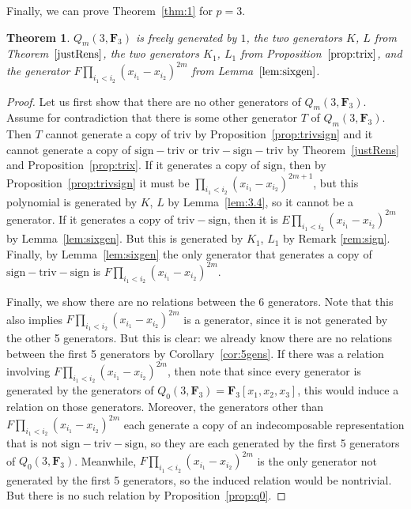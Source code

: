 \documentclass[11pt]{article}
\numberwithin{equation}{section}
\newtheorem{Theorem}{Theorem}[section]
\theoremstyle{definition}
\numberwithin{equation}{section}
\newcommand{\triv}{\mathrm{triv}}
\newcommand{\sign}{\mathrm{sign}}
\newcommand{\trix}{\mathrm{triv-sign-triv}}
\newcommand{\six}{\mathrm{sign-triv-sign}}
\newcommand{\siv}{\mathrm{sign-triv}}
\newcommand{\tign}{\mathrm{triv-sign}}
\begin{document}
 Finally, we can prove Theorem~\ref{thm:1} for $p=3$.

 \begin{Theorem}
 $Q_m(3,\mathbf{F}_3)$ is freely generated by $1$, the two generators $K$, $L$ from Theorem~$\ref{justRens}$, the two generators $K_1$, $L_1$ from Proposition~$\ref{prop:trix}$, and the generator $F\prod_{i_1<i_2}(x_{i_1}-x_{i_2})^{2m}$ from Lemma~$\ref{lem:sixgen}$.
 \end{Theorem}

 \begin{proof}
 Let us first show that there are no other generators of $Q_m(3,\mathbf{F}_3)$. Assume for contradiction that there is some other generator $T$ of $Q_m(3,\mathbf{F}_3)$. Then $T$ cannot generate a copy of $\triv$ by Proposition~\ref{prop:trivsign} and it cannot generate a copy of $\siv$ or $\trix$ by Theorem~\ref{justRens} and Proposition~\ref{prop:trix}. If it generates a copy of $\sign$, then by Proposition~\ref{prop:trivsign} it must be $\prod_{i_1<i_2}(x_{i_1}-x_{i_2})^{2m+1}$, but this polynomial is generated by $K$, $L$ by Lemma~\ref{lem:3.4}, so it cannot be a generator. If it generates a copy of $\tign$, then it is $E\prod_{i_1<i_2}(x_{i_1}-x_{i_2})^{2m}$ by Lemma~\ref{lem:sixgen}. But this is generated by $K_1$, $L_1$ by Remark \ref{rem:sign}. Finally, by Lemma~\ref{lem:sixgen} the only generator that generates a copy of $\six$ is $F\prod_{i_1<i_2}(x_{i_1}-x_{i_2})^{2m}$.

 Finally, we show there are no relations between the 6 generators. Note that this also implies $F\prod_{i_1<i_2}(x_{i_1}-x_{i_2})^{2m}$ is a generator, since it is not generated by the other 5 generators. But this is clear: we already know there are no relations between the first 5 generators by Corollary~\ref{cor:5gens}. If there was a relation involving $F\prod_{i_1<i_2}(x_{i_1}-x_{i_2})^{2m}$, then note that since every generator is generated by the generators of $Q_0(3,\mathbf{F}_3)=\mathbf{F}_3[x_1,x_2,x_3]$, this would induce a relation on those generators. Moreover, the generators other than $F\prod_{i_1<i_2}(x_{i_1}-x_{i_2})^{2m}$ each generate a copy of an indecomposable representation that is not $\six$, so they are each generated by the first 5 generators of $Q_0(3,\mathbf{F}_3)$. Meanwhile, $F\prod_{i_1<i_2}(x_{i_1}-x_{i_2})^{2m}$ is the only generator not generated by the first 5 generators, so the induced relation would be nontrivial. But there is no such relation by Proposition~\ref{prop:q0}.
 \end{proof}
\end{document}
